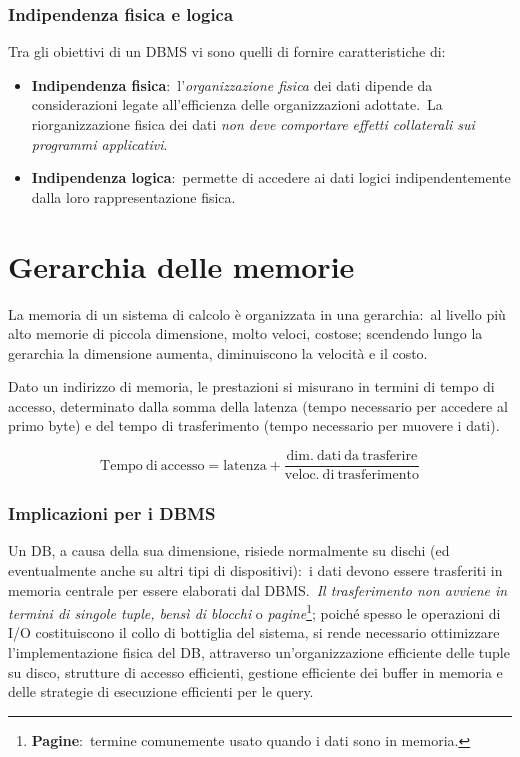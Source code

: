 \subsubsection{Indipendenza fisica e logica}

Tra gli obiettivi di un DBMS vi sono quelli di fornire caratteristiche di:
\begin{itemize}
	\item \textbf{Indipendenza fisica}:\ l'\textit{organizzazione fisica} dei dati dipende da considerazioni legate all'efficienza delle organizzazioni adottate.\ La riorganizzazione fisica dei dati \textit{non deve comportare effetti collaterali sui programmi applicativi}.
	\item \textbf{Indipendenza logica}:\ permette di accedere ai dati logici indipendentemente dalla loro rappresentazione fisica.
\end{itemize}

\section{Gerarchia delle memorie}

La memoria di un sistema di calcolo è organizzata in una gerarchia:\ al livello più alto memorie di piccola dimensione, molto veloci, costose; scendendo lungo la gerarchia la dimensione aumenta, diminuiscono la velocità e il costo.\

Dato un indirizzo di memoria, le prestazioni si misurano in termini di tempo di accesso, determinato dalla somma della latenza (tempo necessario per accedere al primo byte) e del tempo di trasfe\-rimento (tempo necessario per muovere i dati).\

\[\mathrm{Tempo\ di\ accesso = latenza + \frac{dim.\ dati\ da\ trasferire}{ veloc.\ di\ trasferimento}}\]

\subsubsection{Implicazioni per i DBMS}

Un DB, a causa della sua dimensione, risiede normalmente su dischi (ed eventualmente anche su altri tipi di dispositivi):\ i dati devono essere trasferiti in memoria centrale per essere elaborati dal DBMS.\
\textit{Il trasferimento non avviene in termini di singole tuple, bensì di blocchi} o \textit{pagine}\footnote{\textbf{Pagine}:\ termine comunemente usato quando i dati sono in memoria.}; poiché spesso le operazioni di I/O costituiscono il collo di bottiglia del sistema, si rende necessario ottimizzare l'implementazione fisica del DB, attraverso un'organizzazione efficiente delle tuple su disco, strutture di accesso efficienti, gestione efficiente dei buffer in memoria e delle strategie di esecuzione efficienti per le query.

